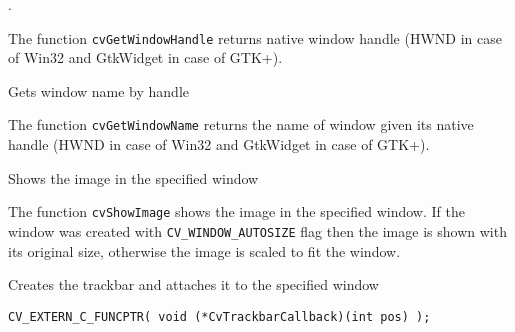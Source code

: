 
\begin{description}
.
\end{description}

The function \texttt{cvGetWindowHandle} returns native window handle (HWND in case of Win32 and GtkWidget in case of GTK+).


Gets window name by handle


\begin{description}
\end{description}

The function \texttt{cvGetWindowName} returns the name of window given its native handle (HWND in case of Win32 and GtkWidget in case of GTK+).


Shows the image in the specified window


\begin{description}
\end{description}

The function \texttt{cvShowImage} shows the image in the specified window. If the window was created with \texttt{CV\_WINDOW\_AUTOSIZE} flag then the image is shown with its original size, otherwise the image is scaled to fit the window.


Creates the trackbar and attaches it to the specified window

\begin{lstlisting}
CV_EXTERN_C_FUNCPTR( void (*CvTrackbarCallback)(int pos) );
\end{lstlisting}

